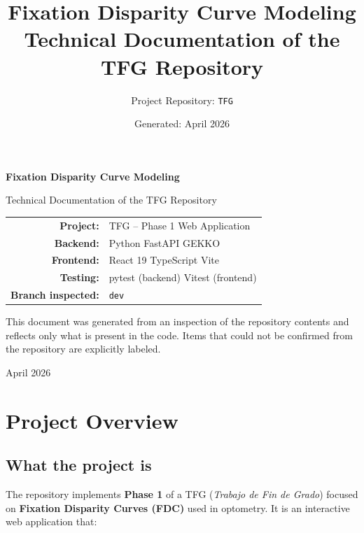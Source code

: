 \documentclass[11pt,a4paper]{article}
\title{%
  \vspace{-1.5cm}
  \textbf{Fixation Disparity Curve Modeling} \\[0.3em]
  \large Technical Documentation of the TFG Repository
}
\author{Project Repository: \texttt{TFG}}
\date{Generated: April 2026}
\begin{document}
\begin{titlepage}
  \centering
  \vspace*{3cm}

  {\Huge\bfseries Fixation Disparity Curve Modeling\par}
  \vspace{1em}
  {\Large Technical Documentation of the TFG Repository\par}

  \vspace{3cm}

  \begin{tabular}{rl}
    \textbf{Project:} & TFG -- Phase 1 Web Application \\
    \textbf{Backend:} & Python \textbullet{} FastAPI \textbullet{} GEKKO \\
    \textbf{Frontend:} & React 19 \textbullet{} TypeScript \textbullet{} Vite \\
    \textbf{Testing:} & pytest (backend) \textbullet{} Vitest (frontend) \\
    \textbf{Branch inspected:} & \texttt{dev} \\
  \end{tabular}

  \vfill
  {\large This document was generated from an inspection of the repository
  contents and reflects only what is present in the code. Items that could
  not be confirmed from the repository are explicitly labeled.\par}
  \vspace{1cm}
  {\large April 2026\par}
\end{titlepage}

\tableofcontents
\newpage

\section{Project Overview}
\label{sec:overview}

\subsection{What the project is}
The repository implements \textbf{Phase 1} of a TFG (\emph{Trabajo de Fin de
Grado}) focused on \textbf{Fixation Disparity Curves (FDC)} used in optometry.
It is an interactive web application that:
\end{document}
